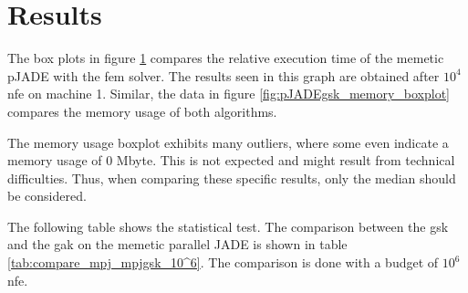 \documentclass[./\jobname.tex]{subfiles}
\begin{document}
\section{Results}

The box plots in figure \ref{fig:pJADEgsk_time_boxplot} compares the relative execution time of the memetic pJADE with the \gls{fem} solver. The results seen in this graph are obtained after $10^4$ \gls{nfe} on machine 1. Similar, the data in figure \ref{fig:pJADEgsk_memory_boxplot} compares the memory usage of both algorithms. 

The memory usage boxplot exhibits many outliers, where some even indicate a memory usage of 0 Mbyte. This is not expected and might result from technical difficulties. Thus, when comparing these specific results, only the median should be considered. 

The following table shows the statistical test. The comparison between the \gls{gsk} and the \gls{gak} on the memetic parallel JADE is shown in table \ref{tab:compare_mpj_mpjgsk_10^6}. The comparison is done with a budget of $10^6$ \gls{nfe}. 

\begin{figure}[H]
	\centering
	\noindent{}
	\label{fig:pJADEgsk_time_boxplot}
\end{figure}
\end{document}

